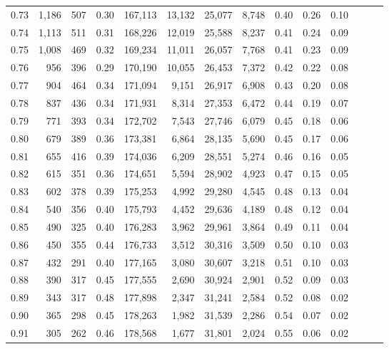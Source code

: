 \begin{tabular}{rrrrrrrrrrrrrr}
0.73 &  1,186 &  507 &  0.30 &  167,113 &   13,132 &  25,077 &   8,748 &  0.40 &  0.26 &      0.10 \\
0.74 &  1,113 &  511 &  0.31 &  168,226 &   12,019 &  25,588 &   8,237 &  0.41 &  0.24 &      0.09 \\
0.75 &  1,008 &  469 &  0.32 &  169,234 &   11,011 &  26,057 &   7,768 &  0.41 &  0.23 &      0.09 \\
0.76 &    956 &  396 &  0.29 &  170,190 &   10,055 &  26,453 &   7,372 &  0.42 &  0.22 &      0.08 \\
0.77 &    904 &  464 &  0.34 &  171,094 &    9,151 &  26,917 &   6,908 &  0.43 &  0.20 &      0.08 \\
0.78 &    837 &  436 &  0.34 &  171,931 &    8,314 &  27,353 &   6,472 &  0.44 &  0.19 &      0.07 \\
0.79 &    771 &  393 &  0.34 &  172,702 &    7,543 &  27,746 &   6,079 &  0.45 &  0.18 &      0.06 \\
0.80 &    679 &  389 &  0.36 &  173,381 &    6,864 &  28,135 &   5,690 &  0.45 &  0.17 &      0.06 \\
0.81 &    655 &  416 &  0.39 &  174,036 &    6,209 &  28,551 &   5,274 &  0.46 &  0.16 &      0.05 \\
0.82 &    615 &  351 &  0.36 &  174,651 &    5,594 &  28,902 &   4,923 &  0.47 &  0.15 &      0.05 \\
0.83 &    602 &  378 &  0.39 &  175,253 &    4,992 &  29,280 &   4,545 &  0.48 &  0.13 &      0.04 \\
0.84 &    540 &  356 &  0.40 &  175,793 &    4,452 &  29,636 &   4,189 &  0.48 &  0.12 &      0.04 \\
0.85 &    490 &  325 &  0.40 &  176,283 &    3,962 &  29,961 &   3,864 &  0.49 &  0.11 &      0.04 \\
0.86 &    450 &  355 &  0.44 &  176,733 &    3,512 &  30,316 &   3,509 &  0.50 &  0.10 &      0.03 \\
0.87 &    432 &  291 &  0.40 &  177,165 &    3,080 &  30,607 &   3,218 &  0.51 &  0.10 &      0.03 \\
0.88 &    390 &  317 &  0.45 &  177,555 &    2,690 &  30,924 &   2,901 &  0.52 &  0.09 &      0.03 \\
0.89 &    343 &  317 &  0.48 &  177,898 &    2,347 &  31,241 &   2,584 &  0.52 &  0.08 &      0.02 \\
0.90 &    365 &  298 &  0.45 &  178,263 &    1,982 &  31,539 &   2,286 &  0.54 &  0.07 &      0.02 \\
0.91 &    305 &  262 &  0.46 &  178,568 &    1,677 &  31,801 &   2,024 &  0.55 &  0.06 &      0.02 \\

\end{tabular}
